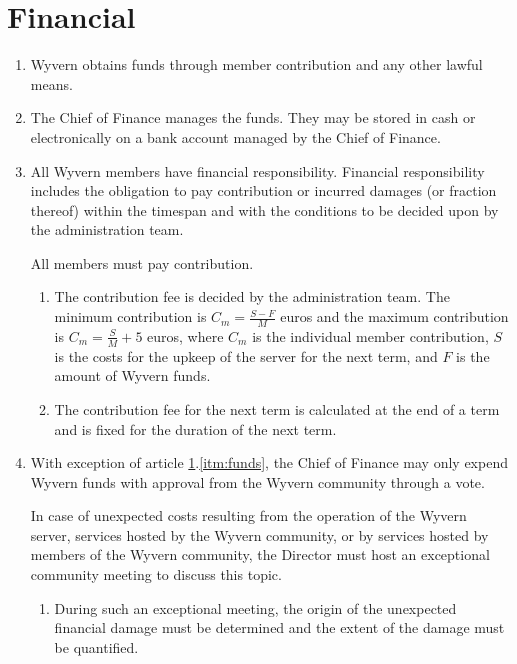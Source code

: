 \section{Financial}
\label{sec:financial}

\begin{enumerate}
    \item Wyvern obtains funds through member contribution and any other lawful means.

    \item The Chief of Finance manages the funds. They may be stored in cash or electronically on a bank account managed by the Chief of Finance.

    \item All Wyvern members have financial responsibility. Financial responsibility includes the obligation to pay contribution or incurred damages (or fraction thereof) within the timespan and with the conditions to be decided upon by the administration team.

    \begin{item}
        All members must pay contribution.
        \begin{enumerate}
            \item The contribution fee is decided by the administration team. The minimum contribution is $C_m = \frac{S-F}{M}$ euros and the maximum contribution is $C_m = \frac{S}{M} + 5$ euros, where $C_m$ is the individual member contribution, $S$ is the costs for the upkeep of the server for the next term, and $F$ is the amount of Wyvern funds.
            \item The contribution fee for the next term is calculated at the end of a term and is fixed for the duration of the next term.
        \end{enumerate}
    \end{item}

    \item With exception of article \ref{sec:financial}.\ref{itm:funds}, the Chief of Finance may only expend Wyvern funds with approval from the Wyvern community through a vote.

    \begin{item}
         In case of unexpected costs resulting from the operation of the Wyvern server, services hosted by the Wyvern community, or by services hosted by members of the Wyvern community, the Director must host an exceptional community meeting to discuss this topic.
        
        \begin{enumerate}
            \item During such an exceptional meeting, the origin of the unexpected financial damage must be determined and the extent of the damage must be quantified.


\end{enumerate}
\end{item}
\end{enumerate}
